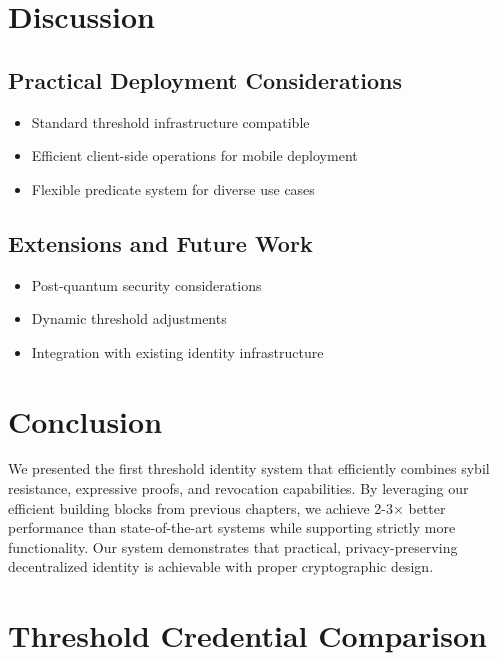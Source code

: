 \section{Discussion}
\label{sec:threshold-discussion}

\subsection{Practical Deployment Considerations}
\begin{itemize}
    \item Standard threshold infrastructure compatible
    \item Efficient client-side operations for mobile deployment
    \item Flexible predicate system for diverse use cases
\end{itemize}

\subsection{Extensions and Future Work}
\begin{itemize}
    \item Post-quantum security considerations
    \item Dynamic threshold adjustments
    \item Integration with existing identity infrastructure
\end{itemize}

\section{Conclusion}
\label{sec:threshold-conclusion}

We presented the first threshold identity system that efficiently combines sybil resistance, expressive proofs, and revocation capabilities. By leveraging our efficient building blocks from previous chapters, we achieve 2-3× better performance than state-of-the-art systems while supporting strictly more functionality. Our system demonstrates that practical, privacy-preserving decentralized identity is achievable with proper cryptographic design.














\section{Threshold Credential Comparison}




